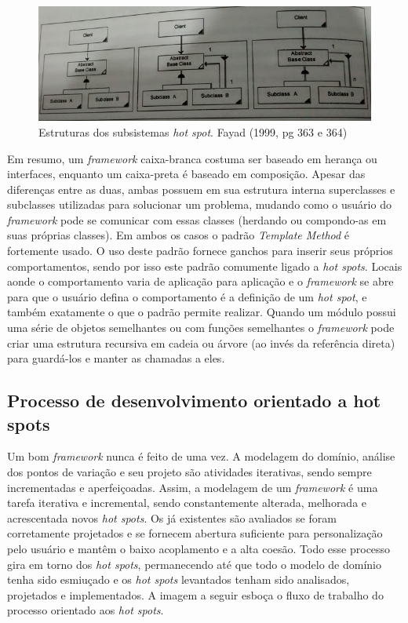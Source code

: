 \begin{figure}[h]
	\centering
	\label{fig13}
		\includegraphics[keepaspectratio=true,scale=0.4]{figuras/subsistemaHotspot.jpg}
	\caption{Estruturas dos subsistemas \textit{hot spot}. Fayad (1999, pg 363 e 364)}
\end{figure}

Em resumo, um \textit{framework} caixa-branca costuma ser baseado em herança ou interfaces, enquanto um caixa-preta é baseado em composição. Apesar das diferenças entre as duas, ambas possuem em sua estrutura interna superclasses e subclasses utilizadas para solucionar um problema, mudando como o usuário do \textit{framework} pode se comunicar com essas classes (herdando ou compondo-as em suas próprias classes). Em ambos os casos o padrão \textit{Template Method} é fortemente usado. O uso deste padrão fornece ganchos para inserir seus próprios comportamentos, sendo por isso este padrão comumente ligado a \textit{hot spots}. Locais aonde o comportamento varia de aplicação para aplicação e o \textit{framework} se abre para que o usuário defina o comportamento é a definição de um \textit{hot spot}, e também exatamente o que o padrão permite realizar. Quando um módulo possui uma série de objetos semelhantes ou com funções semelhantes o \textit{framework} pode criar uma estrutura recursiva em cadeia ou árvore (ao invés da referência direta) para guardá-los e manter as chamadas a eles.

\subsection{Processo de desenvolvimento orientado a hot spots}

Um bom \textit{framework} nunca é feito de uma vez. A modelagem do domínio, análise dos pontos de variação e seu projeto são atividades iterativas, sendo sempre incrementadas e aperfeiçoadas. Assim, a modelagem de um \textit{framework} é uma tarefa iterativa e incremental, sendo constantemente alterada, melhorada e acrescentada novos \textit{hot spots}. Os já existentes são avaliados se foram corretamente projetados e se fornecem abertura suficiente para personalização pelo usuário e mantêm o baixo acoplamento e a alta coesão. Todo esse processo gira em torno dos \textit{hot spots}, permanecendo até que todo o modelo de domínio tenha sido esmiuçado e os \textit{hot spots} levantados tenham sido analisados, projetados e implementados. A imagem a seguir esboça o fluxo de trabalho do processo orientado aos \textit{hot spots}.

